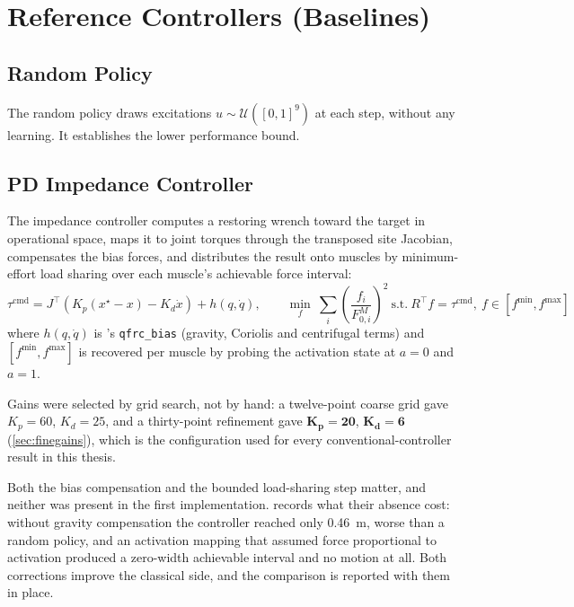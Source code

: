 \section{Reference Controllers (Baselines)}

\subsection{Random Policy}

The random policy draws excitations $u \sim \mathcal{U}([0,1]^9)$ at each step,
without any learning. It establishes the lower performance bound.

\subsection{PD Impedance Controller}

The impedance controller computes a restoring wrench toward the target in
operational space, maps it to joint torques through the transposed site Jacobian,
compensates the bias forces, and distributes the result onto muscles by
minimum-effort load sharing over each muscle's achievable force interval:
\begin{equation}
  \tau^\text{cmd} = J^\top\!\left(K_p (x^\star - x) - K_d \dot{x}\right)
                   + h(q,\dot q),
  \qquad
  \min_{f}\ \sum_i \left(\frac{f_i}{F_{0,i}^M}\right)^{2}
  \ \text{s.t.}\ R^\top f = \tau^\text{cmd},\ f \in [f^{\min}, f^{\max}]
  \label{eq:pd_controller}
\end{equation}
where $h(q,\dot q)$ is \MuJoCo{}'s \texttt{qfrc\_bias} (gravity, Coriolis and
centrifugal terms) and $[f^{\min}, f^{\max}]$ is recovered per muscle by probing
the activation state at $a=0$ and $a=1$.

Gains were selected by grid search, not by hand: a twelve-point coarse grid gave
$K_p = 60$, $K_d = 25$, and a thirty-point refinement gave
$\mathbf{K_p = 20}$, $\mathbf{K_d = 6}$ (\cref{sec:finegains}), which is the
configuration used for every conventional-controller result in this thesis.

Both the bias compensation and the bounded load-sharing step matter, and neither
was present in the first implementation.  records what
their absence cost: without gravity compensation the controller reached only
\SI{0.46}{\meter}, worse than a random policy, and an activation mapping that
assumed force proportional to activation produced a zero-width achievable
interval and no motion at all. Both corrections improve the classical side, and
the comparison is reported with them in place.

